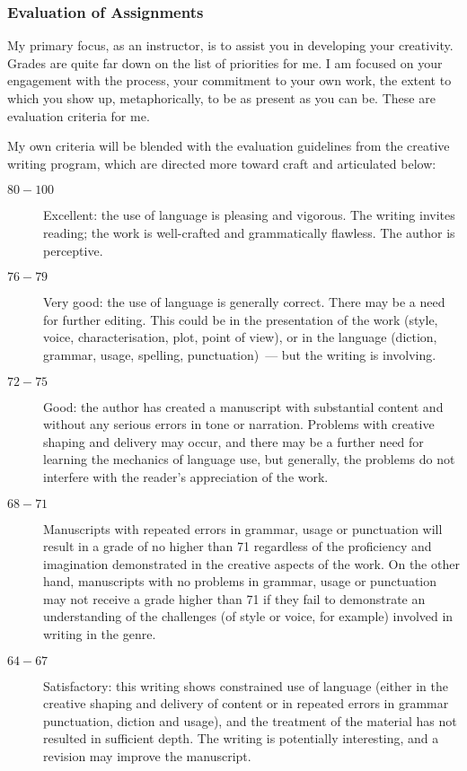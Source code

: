 \documentclass[letterpaper,10pt,headsepline]{scrreprt}
\begin{document}
\subsubsection{Evaluation of Assignments}
My primary focus, as an instructor, is to assist you in developing
your creativity. Grades are quite far down on the list of priorities
for me. I am focused on your engagement with the process, your
commitment to your own work, the extent to which you show up,
metaphorically, to be as present as you can be. These are evaluation
criteria for me.

My own criteria will be blended with the evaluation guidelines from
the creative writing program, which are directed more toward craft and
articulated below:

\begin{description}

\item[$80-100$] Excellent: the use of language is pleasing and
  vigorous. The writing invites reading; the work is well-crafted and
  grammatically flawless. The author is perceptive.

\item[$76-79$] Very good: the use of language is generally correct.
  There may be a need for further editing. This could be in the
  presentation of the work (style, voice, characterisation, plot,
  point of view), or in the language (diction, grammar, usage,
  spelling, punctuation)~--- but the writing is involving.

\item[$72-75$] Good: the author has created a manuscript with
  substantial content and without any serious errors in tone or
  narration. Problems with creative shaping and delivery may occur,
  and there may be a further need for learning the mechanics of
  language use, but generally, the problems do not interfere with the
  reader's appreciation of the work.

\item[$68-71$] Manuscripts with repeated errors in grammar, usage or
  punctuation will result in a grade of no higher than 71 regardless
  of the proficiency and imagination demonstrated in the creative
  aspects of the work. On the other hand, manuscripts with no problems
  in grammar, usage or punctuation may not receive a grade higher than
  71 if they fail to demonstrate an understanding of the challenges
  (of style or voice, for example) involved in writing in the genre.


\item[$64-67$] Satisfactory: this writing shows constrained use of language
  (either in the creative shaping and delivery of content or in
  repeated errors in grammar punctuation, diction and usage), and the
  treatment of the material has not resulted in sufficient depth. The
  writing is potentially interesting, and a revision may improve the
  manuscript.


\end{description}
\end{document}
